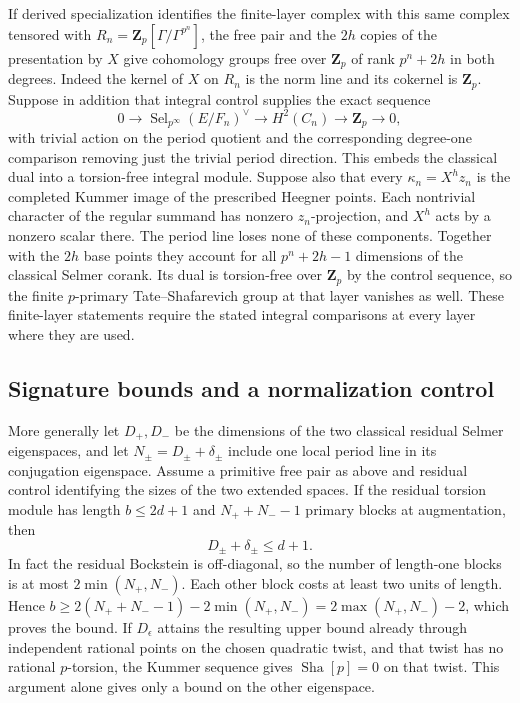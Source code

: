 \documentclass[11pt]{article}
\newcommand{\Z}{\mathbf Z}
\newcommand{\Sel}{\operatorname{Sel}}
\begin{document}
If derived specialization identifies the finite-layer complex with
this same complex tensored with $R_n=\Z_p[\Gamma/\Gamma^{p^n}]$,
the free pair and the $2h$ copies of the presentation by $X$ give
cohomology groups free over $\Z_p$ of rank $p^n+2h$ in both degrees.
Indeed the kernel of $X$ on $R_n$ is the norm line and its cokernel is
$\Z_p$. Suppose in addition that integral control supplies the exact sequence
\[
 0\longrightarrow\Sel_{p^\infty}(E/F_n)^\vee
 \longrightarrow H^2(C_n)\longrightarrow\Z_p\longrightarrow0,
\]
with trivial action on the period quotient and the corresponding
degree-one comparison removing just the trivial period direction.
This embeds the classical dual into a torsion-free integral module.
Suppose also that every
$\kappa_n=X^h z_n$ is the completed Kummer image of the prescribed
Heegner points. Each nontrivial character of the regular summand has
nonzero $z_n$-projection, and $X^h$ acts by a nonzero scalar there.
The period line loses none of these components. Together with the
$2h$ base points they account for all $p^n+2h-1$ dimensions of the
classical Selmer corank. Its dual is torsion-free over $\Z_p$ by the
control sequence, so the finite $p$-primary Tate--Shafarevich group
at that layer vanishes as well. These finite-layer statements require
the stated integral comparisons at every layer where they are used.

\subsection{Signature bounds and a normalization control}

More generally let $D_+,D_-$ be the dimensions of the two classical
residual Selmer eigenspaces, and let $N_\pm=D_\pm+\delta_\pm$ include
one local period line in its conjugation eigenspace. Assume a primitive
free pair as above and residual control identifying the sizes of the
two extended spaces. If the residual torsion module has length
$b\le2d+1$ and $N_++N_--1$ primary blocks at augmentation, then
\[
                  D_\pm+\delta_\pm\le d+1.
\]
In fact the residual Bockstein is off-diagonal, so the number of
length-one blocks is at most $2\min(N_+,N_-)$. Each other block costs
at least two units of length. Hence
$b\ge2(N_++N_--1)-2\min(N_+,N_-)=2\max(N_+,N_-)-2$,
which proves the bound. If $D_\epsilon$ attains the resulting upper
bound already through independent rational points on the chosen
quadratic twist, and that twist has no rational $p$-torsion, the
Kummer sequence gives $\operatorname{Sha}[p]=0$ on that twist.
This argument alone gives only a bound on the other eigenspace.
\end{document}
